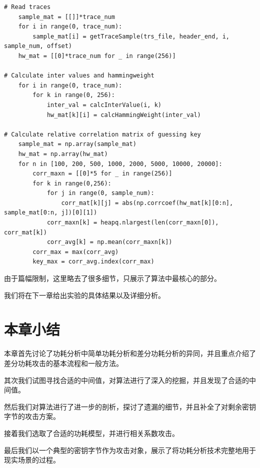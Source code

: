 \begin{lstlisting}[style=myPython,label={lst:whole_attack},caption={差分功耗分析攻击的完整流程}]
# Read traces
    sample_mat = [[]]*trace_num
    for i in range(0, trace_num):
        sample_mat[i] = getTraceSample(trs_file, header_end, i, sample_num, offset)
    hw_mat = [[0]*trace_num for _ in range(256)]

# Calculate inter values and hammingweight
    for i in range(0, trace_num):
        for k in range(0, 256):
            inter_val = calcInterValue(i, k)
            hw_mat[k][i] = calcHammingWeight(inter_val)

# Calculate relative correlation matrix of guessing key
    sample_mat = np.array(sample_mat)
    hw_mat = np.array(hw_mat)
    for n in [100, 200, 500, 1000, 2000, 5000, 10000, 20000]:
        corr_maxn = [[0]*5 for _ in range(256)]
        for k in range(0,256):
            for j in range(0, sample_num):
                corr_mat[k][j] = abs(np.corrcoef(hw_mat[k][0:n], sample_mat[0:n, j])[0][1])
            corr_maxn[k] = heapq.nlargest(len(corr_maxn[0]), corr_mat[k])
            corr_avg[k] = np.mean(corr_maxn[k])
        corr_max = max(corr_avg)
        key_max = corr_avg.index(corr_max)
\end{lstlisting}

由于篇幅限制，这里略去了很多细节，只展示了算法中最核心的部分。

我们将在下一章给出实验的具体结果以及详细分析。


\section{本章小结}


本章首先讨论了功耗分析中简单功耗分析和差分功耗分析的异同，并且重点介绍了差分功耗攻击的基本流程和一般方法。

其次我们试图寻找合适的中间值，对算法进行了深入的挖掘，并且发现了合适的中间值。

然后我们对算法进行了进一步的剖析，探讨了遗漏的细节，并且补全了对剩余密钥字节的攻击方案。

接着我们选取了合适的功耗模型，并进行相关系数攻击。

最后我们以一个典型的密钥字节作为攻击对象，展示了将功耗分析技术完整地用于现实场景的过程。
